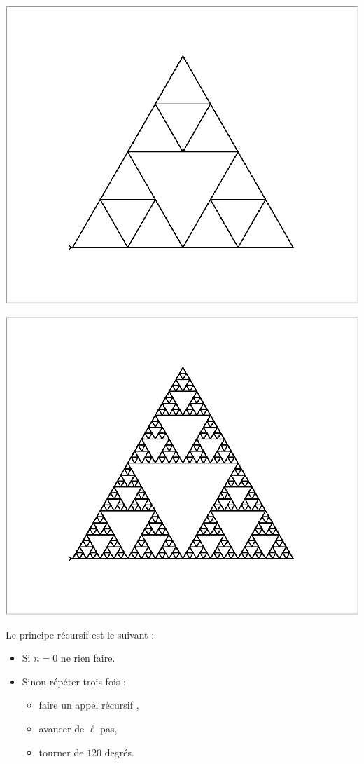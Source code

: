 \documentclass[11pt,class=report,crop=false]{standalone}
\begin{document}
\begin{activite}
\begin{enumerate}
\begin{center}
\includegraphics[scale=\myscale,scale=0.14]{ecran_tortue_sierp3}

\includegraphics[scale=\myscale,scale=0.25]{ecran_tortue_sierp6}
\end{center}

Le principe récursif est le suivant :
\begin{itemize}
  \item Si $n=0$ ne rien faire.
  \item Sinon répéter trois fois :
  \begin{itemize}
    \item faire un appel récursif , 
    \item avancer de $\ell$ pas,
    \item tourner de $120$ degrés.
  \end{itemize}
\end{itemize}



\end{enumerate}
\end{activite}
\end{document}
